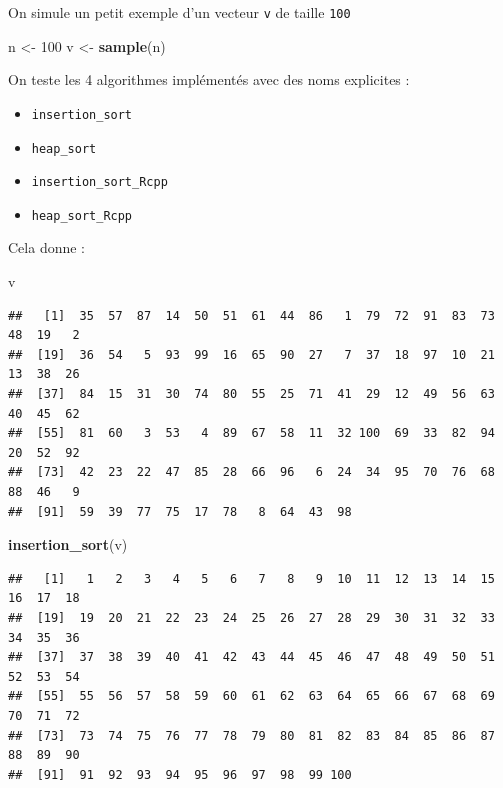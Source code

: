 \documentclass[
]{article}
\newenvironment{Shaded}{\begin{snugshade}}{\end{snugshade}}
\newcommand{\DecValTok}[1]{\textcolor[rgb]{0.00,0.00,0.81}{#1}}
\newcommand{\FunctionTok}[1]{\textcolor[rgb]{0.13,0.29,0.53}{\textbf{#1}}}
\newcommand{\NormalTok}[1]{#1}
\newcommand{\OtherTok}[1]{\textcolor[rgb]{0.56,0.35,0.01}{#1}}
\providecommand{\tightlist}{%
  \setlength{\itemsep}{0pt}\setlength{\parskip}{0pt}}
\begin{document}
On simule un petit exemple d'un vecteur \texttt{v} de taille
\texttt{100}

\begin{Shaded}
\begin{Highlighting}[]
\NormalTok{n }\OtherTok{\textless{}{-}} \DecValTok{100}
\NormalTok{v }\OtherTok{\textless{}{-}} \FunctionTok{sample}\NormalTok{(n)}
\end{Highlighting}
\end{Shaded}

On teste les 4 algorithmes implémentés avec des noms explicites :

\begin{itemize}
\tightlist
\item
  \texttt{insertion\_sort}
\item
  \texttt{heap\_sort}
\item
  \texttt{insertion\_sort\_Rcpp}
\item
  \texttt{heap\_sort\_Rcpp}
\end{itemize}

Cela donne :

\begin{Shaded}
\begin{Highlighting}[]
\NormalTok{v}
\end{Highlighting}
\end{Shaded}

\begin{verbatim}
##   [1]  35  57  87  14  50  51  61  44  86   1  79  72  91  83  73  48  19   2
##  [19]  36  54   5  93  99  16  65  90  27   7  37  18  97  10  21  13  38  26
##  [37]  84  15  31  30  74  80  55  25  71  41  29  12  49  56  63  40  45  62
##  [55]  81  60   3  53   4  89  67  58  11  32 100  69  33  82  94  20  52  92
##  [73]  42  23  22  47  85  28  66  96   6  24  34  95  70  76  68  88  46   9
##  [91]  59  39  77  75  17  78   8  64  43  98
\end{verbatim}

\begin{Shaded}
\begin{Highlighting}[]
\FunctionTok{insertion\_sort}\NormalTok{(v)}
\end{Highlighting}
\end{Shaded}

\begin{verbatim}
##   [1]   1   2   3   4   5   6   7   8   9  10  11  12  13  14  15  16  17  18
##  [19]  19  20  21  22  23  24  25  26  27  28  29  30  31  32  33  34  35  36
##  [37]  37  38  39  40  41  42  43  44  45  46  47  48  49  50  51  52  53  54
##  [55]  55  56  57  58  59  60  61  62  63  64  65  66  67  68  69  70  71  72
##  [73]  73  74  75  76  77  78  79  80  81  82  83  84  85  86  87  88  89  90
##  [91]  91  92  93  94  95  96  97  98  99 100
\end{verbatim}
\end{document}

